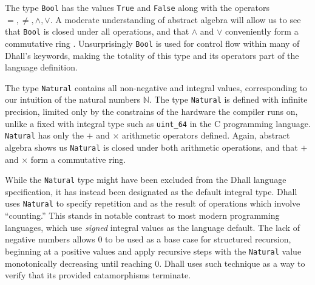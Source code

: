\documentclass[12pt]{diazessay}
\newcommand{\Bool   }{\texttt{Bool}}
\newcommand{\Nat    }{\texttt{Natural}}
\begin{document}
The type \Bool{} has the values \texttt{True} and \texttt{False} along with the operators $=, \ne, \land, \lor$.
A moderate understanding of abstract algebra will allow us to see that \Bool{} is closed under all operations, and that $\land$ and $\lor$ conveniently form a commutative ring \cite{noether1921idealtheorie}.
Unsurprisingly \Bool{} is used for control flow within many of Dhall's keywords, making the totality of this type and its operators part of the language definition.

The type \Nat{} contains all non-negative and integral values, corresponding to our intuition of the natural numbers $\mathbb{N}$.
The type \Nat{} is defined with infinite precision, limited only by the constrains of the hardware the compiler runs on, unlike a fixed with integral type such as \texttt{uint\_64} in the C programming language.
\Nat{} has only the $+$ and $\times$ arithmetic operators defined.
Again, abstract algebra shows us \Nat{} is closed under both arithmetic operations, and that $+$ and $\times$ form a commutative ring.

While the \Nat{} type might have been excluded from the Dhall language specification, it has instead been designated as the default integral type.
Dhall uses \Nat{} to specify repetition and as the result of operations which involve ``counting.'' This stands in notable contrast to most modern programming languages, which use \emph{signed} integral values as the language default.
The lack of negative numbers allows $0$ to be used as a base case for structured recursion, beginning at a positive values and apply recursive steps with the \Nat{} value monotonically decreasing until reaching $0$.
Dhall uses such technique as a way to verify that its provided catamorphisms terminate.
\end{document}
